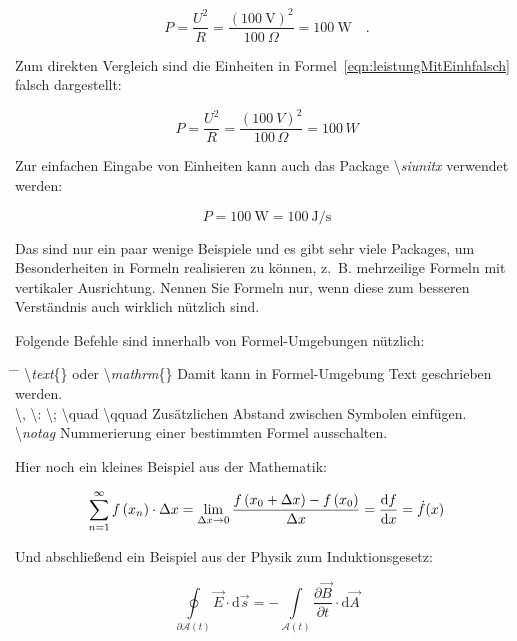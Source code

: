 \begin{equation}
P=\frac{U^2}{R} = \frac{\left( 100~\mathrm{V}\right)^2}{100~\Omega} = 100~\mathrm{W}\quad .
\label{eqn:leistungMitEinh}
\end{equation}

Zum direkten Vergleich sind die Einheiten in Formel~\ref{eqn:leistungMitEinhfalsch} falsch dargestellt:

\begin{equation}
P=\frac{U^2}{R} = \frac{\left( 100~V\right)^2}{100\,\varOmega} = 100\,W
\label{eqn:leistungMitEinhfalsch}
\end{equation}

Zur einfachen Eingabe von Einheiten kann auch das Package \textbackslash \textit{siunitx} verwendet werden:

\begin{equation}
	P=\SI{100}{\watt}=\SI{100}{\joule\per\second}
\end{equation}

Das sind nur ein paar wenige Beispiele und es gibt sehr viele Packages, um Besonderheiten in Formeln realisieren zu können, z.~B. mehrzeilige Formeln mit vertikaler Ausrichtung. Nennen Sie Formeln nur, wenn diese zum besseren Verständnis auch wirklich nützlich sind.

Folgende Befehle sind innerhalb von Formel-Umgebungen nützlich:
\begin{tabbing}
	\hspace*{0cm} \= \hspace{0.28\linewidth} \= \+\kill
	\textbackslash \textit{text}\{\} oder \textbackslash \textit{mathrm}\{\}	\> Damit kann in Formel-Umgebung Text geschrieben werden.\\ 
	\textbackslash, \textbackslash: \textbackslash; \textbackslash quad \textbackslash qquad \> Zusätzlichen Abstand zwischen Symbolen einfügen.\\
	\textbackslash \textit{notag} \> Nummerierung einer bestimmten Formel ausschalten.
\end{tabbing}

Hier noch ein kleines Beispiel aus der Mathematik:

\begin{equation}
\sum\limits_{n=1}^\infty f\left(x_n\right)\cdot \Delta x=  \lim\limits_{\Delta x \rightarrow 0} \frac{f\left(x_0+\Delta x\right)-f\left(x_0\right)}{\Delta x} = \frac{\mathop{}\!\mathrm{d} f}{\mathop{}\!\mathrm{d} x} = \dot{f}(x)
\end{equation}

Und abschließend ein Beispiel aus der Physik zum Induktionsgesetz:

\begin{equation}
\oint \limits _{\partial {\mathcal {\mathcal {A}}}(t)}{{\vec {E}}\cdot {\text{d}}{\vec {s}}}=-\int \limits _{{\mathcal {A}}(t)}{{\frac {\partial {\vec {B}}}{\partial t}}\cdot {\text{d}}{\vec {A}}}
\end{equation}

